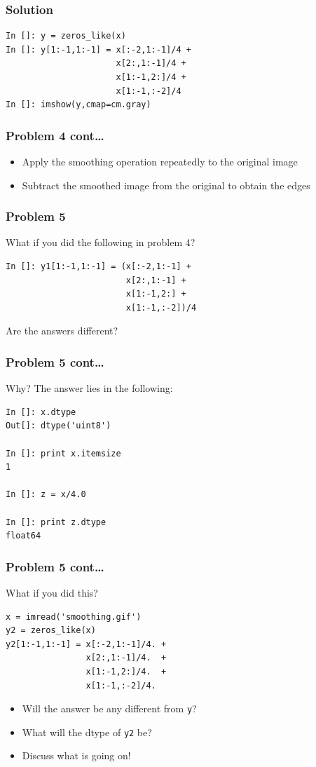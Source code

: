 \documentclass[14pt,compress]{beamer}
\newcommand{\typ}[1]{\lstinline{#1}}
\begin{document}
\begin{frame}[fragile]
  \frametitle{Solution}
  \begin{lstlisting}
In []: y = zeros_like(x)
In []: y[1:-1,1:-1] = x[:-2,1:-1]/4 +
                      x[2:,1:-1]/4 +
                      x[1:-1,2:]/4 +
                      x[1:-1,:-2]/4
In []: imshow(y,cmap=cm.gray)
  \end{lstlisting}
\end{frame}

\begin{frame}[fragile]
  \frametitle{Problem 4 cont\ldots}
  \begin{itemize}
      \item Apply the smoothing operation repeatedly to the original
          image

      \item Subtract the smoothed image from the original to obtain
          the edges
  \end{itemize}
\end{frame}

\begin{frame}[fragile]
  \frametitle{Problem 5}

  What if you did the following in problem 4?
  \begin{lstlisting}
In []: y1[1:-1,1:-1] = (x[:-2,1:-1] +
                        x[2:,1:-1] +
                        x[1:-1,2:] +
                        x[1:-1,:-2])/4
  \end{lstlisting}

    Are the answers different? 

\end{frame}

\begin{frame}[fragile]
  \frametitle{Problem 5 cont\ldots}
  Why? The answer lies in the following:
\begin{lstlisting}
In []: x.dtype
Out[]: dtype('uint8')

In []: print x.itemsize
1

In []: z = x/4.0

In []: print z.dtype
float64

\end{lstlisting}
\end{frame}

\begin{frame}[fragile]
  \frametitle{Problem 5 cont\ldots}
What if you did this?

\begin{lstlisting}
x = imread('smoothing.gif')
y2 = zeros_like(x)
y2[1:-1,1:-1] = x[:-2,1:-1]/4. + 
                x[2:,1:-1]/4.  +
                x[1:-1,2:]/4.  +
                x[1:-1,:-2]/4.
\end{lstlisting}
\begin{itemize}
    \item Will the answer be any different from \typ{y}?
    \item What will the dtype of \typ{y2} be?
    \item Discuss what is going on!
\end{itemize}

\end{frame}
\end{document}
